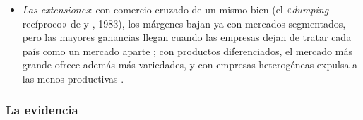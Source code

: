 \documentclass[11pt]{article}
\begin{document}
\begin{itemize}
\begin{itemize}
  \item \emph{las barreras que no son aranceles también segmentan}: normas técnicas distintas, licencias nacionales o compras públicas cerradas mantienen el mercado de cada empresa en el tamaño de su país, y quitarlas tiene el mismo efecto que integrar.
  \end{itemize}
\item \emph{Las extensiones}: con comercio cruzado de un mismo bien (el «\emph{dumping} recíproco» de  y , 1983), los márgenes bajan ya con mercados segmentados, pero las mayores ganancias llegan cuando las empresas dejan de tratar cada país como un mercado aparte ; con productos diferenciados, el mercado más grande ofrece además más variedades, y con empresas heterogéneas expulsa a las menos productivas .
\end{itemize}

\subsubsection{La evidencia}\label{sec:efectos-evidencia}
\end{document}
